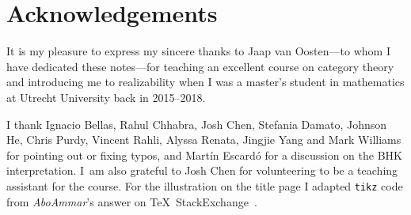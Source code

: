 \chapter{Acknowledgements}

It is my pleasure to express my sincere thanks to Jaap van Oosten---to whom I
have dedicated these notes---for teaching an excellent course on category
theory~\cite{vanOosten2016} and introducing me to realizability when I was a
master's student in mathematics at Utrecht University back in 2015--2018.

I thank Ignacio Bellas, Rahul Chhabra, Josh Chen, Stefania Damato, Johnson He,
Chris Purdy, Vincent Rahli, Alyssa Renata, Jingjie Yang and Mark Williams for
pointing out or fixing typos, and Mart\'in Escard\'o for a discussion on the BHK
interpretation.
%
I~am also grateful to Josh Chen for volunteering to be a teaching assistant for
the course.
%
For the illustration on the title page I adapted \verb|tikz| code from
\emph{AboAmmar}'s answer on \TeX\ StackExchange~\cite{latex-triangle}.

